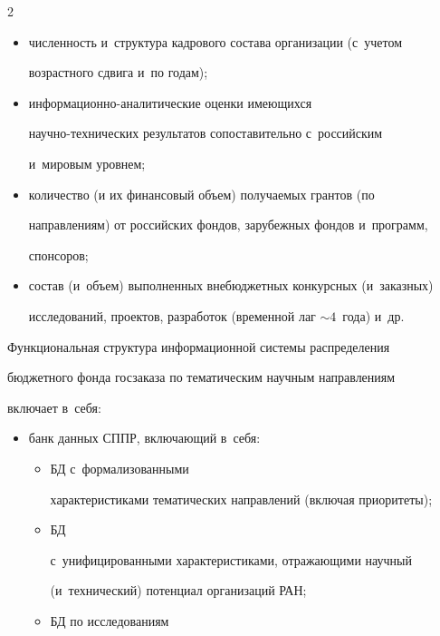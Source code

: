 \begin{multicols}{2}
\begin{itemize}
лаг $\sim5$~лет), дифференцированно по отечественным и~зарубежным 

журналам;

\item численность и~структура кадрового состава организации (с~учетом 

возрастного сдвига и~по годам);

\item информационно-ана\-ли\-ти\-че\-ские оценки име\-ющих\-ся  

на\-уч\-но-тех\-ни\-че\-ских результатов сопоставительно с~российским 

и~мировым уровнем;

\item количество (и их финансовый объем) по\-лу\-ча\-емых грантов (по 

на\-прав\-ле\-ни\-ям) от российских фондов, зарубежных фондов и~программ, 

спонсоров;

\item состав (и~объем) выполненных внебюджетных конкурсных (и~заказных) 

исследований, проектов, разработок (временной лаг $\sim4$~года) и~др. 

    \end{itemize}

    

    Функциональная структура информационной сис\-те\-мы распределения 

бюджетного фонда госзаказа по тематическим научным на\-прав\-ле\-ни\-ям 

включает в~себя: 

    \begin{itemize}

\item  банк данных СППР, включающий в~себя:

\begin{itemize}

\item[(а)] БД с~формализованными 

характеристиками тематических направлений (включая приоритеты); 

\item[(б)] БД 

с~унифицированными характеристиками, отражающими научный 

(и~технический) потенциал организаций РАН; 

\item[(в)] БД по исследованиям 


\end{itemize}
\end{itemize}
\end{multicols}
